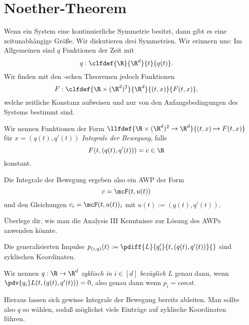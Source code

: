 \documentclass[../WiSe22ANA3.tex]{subfiles}
\begin{document}
		\section{Noether-Theorem}
			Wenn ein System eine kontinuierliche Symmetrie besitzt, dann gibt es eine zeitunabhängige Größe. Wir diskutieren drei Symmetrien. Wir erinnern uns: Im Allgemeinen sind $q$ Funktionen der Zeit mit
			$$q:\clfdef{\R}{\R^d}{t}{q(t)}.$$
			Wir finden mit den \Noether-schen Theoremen jedoch Funktionen 
			$$F:\clfdef{\R\times(\R^d)^2}{\R^d}{(t,x)}{F(t,x)},$$
			welche zeitliche Konstanz aufweisen und nur von den Anfangsbedingungen des Systems bestimmt sind. 
			\begin{info}
				Wir nennen Funktionen der Form $\llfdef{\R\times(\R^d)^2\to\R^d}{(t,x)\mapsto F(t,x)}$ für $x=(q(t),q'(t))$ \emph{Integrale der Bewegung}, falls
				$$F(t,(q(t),q'(t)))=c\in\R$$
				konstant. 
			\end{info}
			Die Integrale der Bewegung ergeben also ein AWP der Form 
			$$c=\mcF(t,u(t))$$
			und den Gleichungen $c_i=\mcF(t,u(t))_i$ mit $u(t):=(q(t),q'(t))$. 
			\begin{Aufgabe}
				\nr Überlege dir, wie man die Analysis III Kenntnisse zur Lösung des AWPs anwenden könnte. 
			\end{Aufgabe}
			Die generalisierten Impulse $p_{(i,q)}(t):=\pdiff{L}{q'_i}{t,(q(t),q'(t))}{}$ sind zyklischen Koordinaten. 
			\begin{info}
				Wir nennen $q:\R\to\R^d$ \emph{zyklisch in} $i\in[d]$ \emph{bezüglich }$L$ genau dann, wenn $\pdv{q_i}L(t,(q(t),q'(t)))=0$, also genau dann wenn $p_i=const.$  
			\end{info}
			Hieraus lassen sich gewisse Integrale der Bewegung bereits ableiten. Man sollte also $q$ so wählen, sodaß möglichst viele Einträge auf zyklische Koordinaten führen. 
\end{document}
